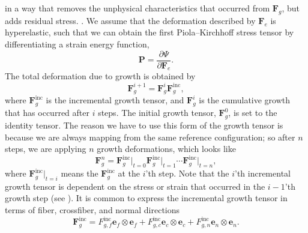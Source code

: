  in a way that removes the unphysical characteristics that occurred from $\mathbf{F}_g$, but adds residual stress. . We assume that the deformation described by $\mathbf{F}_e$ is hyperelastic, such that we can obtain the first Piola–Kirchhoff stress tensor by differentiating a strain energy function,
\begin{equation}
\label{eq: stress}
    \mathbf{P} = \frac{\partial\Psi}{\partial \mathbf{F}_e}.
\end{equation}
The total deformation due to growth is obtained by 
\begin{equation*}
    \mathbf{F}_g^{i + 1} = \mathbf{F}_g^i\mathbf{F}_g^\mathrm{inc},
\end{equation*}
where $\mathbf{F}_g^\mathrm{inc}$ is the incremental growth tensor, and $\mathbf{F}_g^i$ is the cumulative growth that has occurred after $i$ steps. The initial growth tensor, $\mathbf{F}_g^0$, is set to the identity tensor. The reason we have to use this form of the growth tensor is because we are always mapping from the same reference configuration; so after $n$ steps, we are applying $n$ growth deformations, which looks like 
\begin{equation*}
    \mathbf{F}_g^{n} = \mathbf{F}_{g}^\mathrm{inc}\vert_{t=0}\mathbf{F}_{g}^\mathrm{inc}\vert_{t=1} \cdots \mathbf{F}_{g}^\mathrm{inc}\vert_{t=n},
\end{equation*}  
where $\mathbf{F}_{g}^\mathrm{inc}\vert_{t=i}$ means the $\mathbf{F}_{g}^\mathrm{inc}$ at the $i$'th step. Note that the $i$'th incremental growth tensor is dependent on the stress or strain that occurred in the $i-1$'th growth step (see \citep{Goriely2007}). It is common to express the incremental growth tensor in terms of fiber, crossfiber, and normal directions 
\begin{equation*}
    \mathbf{F}_g^\mathrm{inc} = F^\mathrm{inc}_{g,f}\mathbf{e}_f\otimes \mathbf{e}_f + F^\mathrm{inc}_{g,c}\mathbf{e}_c\otimes \mathbf{e}_c + F^\mathrm{inc}_{g,n}\mathbf{e}_n\otimes \mathbf{e}_n.
\end{equation*}
